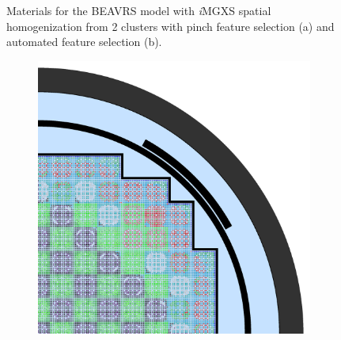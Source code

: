 \begin{figure}[h!]
\begin{subfigure}{0.68\textwidth}
  \caption{}
  \label{fig:chap10-full-core-combined-2}
\end{subfigure}
\caption[Materials for BEAVRS with clustering homogenization (2 clusters)]{Materials for the \ac{BEAVRS} model with \textit{i}\ac{MGXS} spatial homogenization from 2 clusters with pinch feature selection (a) and automated feature selection (b).}
\label{fig:chap10-full-core-geometries-2}
\end{figure}

\clearpage

\begin{figure}[h!]
\centering
\begin{subfigure}{0.68\textwidth}
  \centering
  \includegraphics[width=\linewidth]{figures/unsupervised/geometries/with-features/4-clusters/pinch/full-core}
  \caption{}
  \label{fig:chap10-full-core-pinch-4}
\end{subfigure}
\begin{subfigure}{0.68\textwidth}
  \centering

\end{subfigure}
\end{figure}
